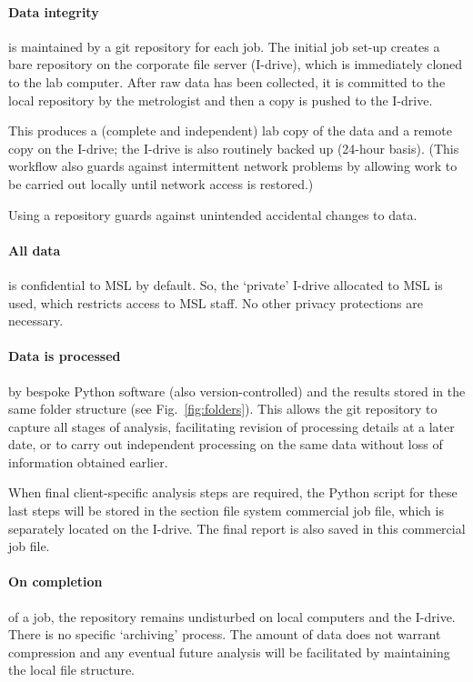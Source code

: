 \paragraph{Data integrity} is maintained by a git repository for each job. The initial job set-up creates a bare repository on the corporate file server (I-drive), which is immediately cloned to the lab computer. After raw data has been collected, it is committed to the local repository by the metrologist and then a copy is pushed to the I-drive. 

This produces a (complete and independent) lab copy of the data and a remote copy on the I-drive; the I-drive is also routinely backed up (24-hour basis). (This workflow also guards against intermittent network problems by allowing work to be carried out locally until network access is restored.)

Using a repository guards against unintended accidental changes to data.

\paragraph{All data} is confidential to MSL by default. So, the `private' I-drive allocated to MSL is used, which restricts access to MSL staff. No other privacy protections are necessary.  

\paragraph{Data is processed} by bespoke Python software (also version-controlled) and the results stored in the same folder structure (see Fig.~\ref{fig:folders}). This allows the git repository to capture all stages of analysis, facilitating revision of processing details at a later date, or to carry out independent processing on the same data without loss of information obtained earlier. 

When final client-specific analysis steps are required, the Python script for these last steps will be stored in the section file system commercial job file, which is separately located on the I-drive. The final report is also saved in this commercial job file. 

\paragraph{On completion} of a job, the repository remains undisturbed on local computers and the I-drive. There is no specific `archiving' process. The amount of data does not warrant compression and any eventual future analysis will be facilitated by maintaining the local file structure. 


